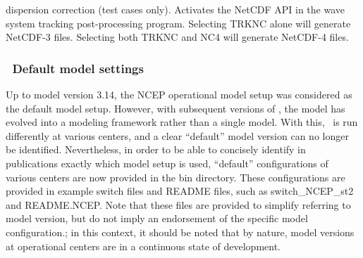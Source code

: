\begin{slist}
{           dispersion correction (test cases only).}
 {Activates the NetCDF API in the wave system tracking
           post-processing program. Selecting TRKNC alone will generate 
           NetCDF-3 files. Selecting both TRKNC and NC4 will generate 
           NetCDF-4 files.}
\end{slist}

\vsssub
\subsubsection{~Default model settings} \label{sub:opt_default}
\vsssub

Up to model version 3.14, the NCEP operational model setup was considered as
the default model setup. However, with subsequent versions of \ws, the model
has evolved into a modeling framework rather than a single model. With this,
\ws\ is run differently at various centers, and a clear ``default'' model
version can no longer be identified.  Nevertheless, in order to be able to
concisely identify in publications exactly which model setup is used,
``default'' configurations of various centers are now provided in the {\file
bin} directory. These configurations are provided in example switch files and
README files, such as {\file switch\_NCEP\_st2} and {\file README.NCEP}. Note
that these files are provided to simplify referring to model version, but do
not imply an endorsement of the specific model configuration.; in this
context, it should be noted that by nature, model versions at operational
centers are in a continuous state of development.




